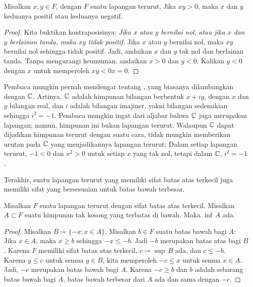 \begin{prop}
Misalkan $x,y \in F$, dengan $F$ suatu lapangan terurut.  Jika
$xy > 0$, maka $x$ dan $y$ keduanya positif atau keduanya negatif.
\end{prop}

\begin{proof}
Kita buktikan kontraposisinya: \emph{Jika $x$ atau $y$ bernilai nol, atau
jika $x$ dan $y$ berlainan tanda, maka $xy$ tidak positif.}
Jika $x$ atau $y$ bernilai nol, maka $xy$ bernilai nol sehingga tidak positif.
Jadi, andaikan $x$ dan $y$ tak nol dan
berlainan tanda.
Tanpa mengurangi keumuman,
andaikan $x > 0$ dan $y < 0$.
Kalikan $y < 0$ dengan $x$ untuk memperoleh $xy < 0x = 0$.
\end{proof}

\begin{example} \label{example:complexfield}
Pembaca mungkin pernah mendengar tentang \emph{},
yang biasanya dilambangkan dengan ${\mathbb{C}}$.
Artinya, ${\mathbb{C}}$ adalah himpunan bilangan berbentuk
$x + iy$, dengan $x$ dan $y$ bilangan real, dan $i$ adalah
bilangan imajiner, yakni bilangan sedemikian sehingga $i^2 = -1$.  Pembaca mungkin
ingat dari aljabar bahwa ${\mathbb{C}}$ juga merupakan lapangan; namun, himpunan ini bukan
lapangan terurut.  Walaupun ${\mathbb{C}}$ dapat dijadikan himpunan terurut dengan suatu cara,
tidak mungkin memberikan
urutan pada ${\mathbb{C}}$ yang menjadikannya lapangan terurut: Dalam setiap lapangan terurut,
$-1 < 0$ dan $x^2 > 0$ untuk setiap $x$ yang tak nol, tetapi dalam ${\mathbb{C}}$, $i^2 = -1$.
\end{example}

Terakhir, suatu lapangan terurut yang memiliki sifat batas atas terkecil juga memiliki
sifat yang bersesuaian untuk batas bawah terbesar.

\begin{prop}
Misalkan $F$ suatu lapangan terurut dengan sifat batas atas terkecil.
Misalkan $A \subset F$ suatu himpunan tak kosong yang terbatas di bawah.
Maka $\inf\, A$ ada.
\end{prop}

\begin{proof}
Misalkan $B \coloneqq \{ -x : x \in A \}$. Misalkan $b \in F$ suatu batas bawah bagi $A$:
Jika $x \in A$, maka $x \geq b$
sehingga $-x \leq -b$.  Jadi $-b$
merupakan batas atas bagi $B$.
Karena $F$ memiliki sifat batas atas terkecil, $c\coloneqq\sup\, B$ ada, dan $c \leq -b$.
Karena $y \leq c$
untuk semua $y \in B$, kita memperoleh $-c \leq x$ untuk semua $x \in A$.
Jadi,
$-c$ merupakan batas bawah bagi $A$.  Karena $-c \geq b$
dan $b$ adalah sebarang batas bawah bagi $A$,
batas bawah terbesar dari $A$ ada dan sama dengan $-c$.
\end{proof}

